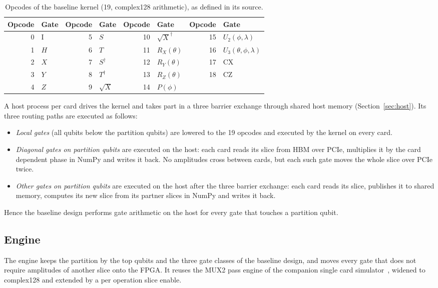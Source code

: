 \begin{table}[t]
\caption{Opcodes of the baseline kernel (19, complex128 arithmetic), as defined in its source.}\label{tab:opcodes}
\begin{tabular}{@{}rlrlrlrl@{}}
\toprule
Opcode & Gate & Opcode & Gate & Opcode & Gate & Opcode & Gate \\
\midrule
0 & I & 5 & $S$ & 10 & $\sqrt{X}^\dagger$ & 15 & $U_2(\phi,\lambda)$ \\
1 & $H$ & 6 & $T$ & 11 & $R_X(\theta)$ & 16 & $U_3(\theta,\phi,\lambda)$ \\
2 & $X$ & 7 & $S^\dagger$ & 12 & $R_Y(\theta)$ & 17 & CX \\
3 & $Y$ & 8 & $T^\dagger$ & 13 & $R_Z(\theta)$ & 18 & CZ \\
4 & $Z$ & 9 & $\sqrt{X}$ & 14 & $P(\phi)$ & & \\
\bottomrule
\end{tabular}
\end{table}
 A host process per card drives the kernel and takes part in a
three barrier exchange through shared host memory (Section~\ref{sec:host}). Its three routing paths are executed as
follows:
\begin{itemize}
\item \emph{Local gates} (all qubits below the partition qubits) are lowered to the 19 opcodes and executed by the
kernel on every card.
\item \emph{Diagonal gates on partition qubits} are executed on the host: each card reads its slice from HBM over
PCIe, multiplies it by the card dependent phase in NumPy and writes it back. No amplitudes cross between cards, but
each such gate moves the whole slice over PCIe twice.
\item \emph{Other gates on partition qubits} are executed on the host after the three barrier exchange: each card
reads its slice, publishes it to shared memory, computes its new slice from its partner slices in NumPy and writes it
back.
\end{itemize}
Hence the baseline design performs gate arithmetic on the host for every gate that touches a partition qubit.

\subsection{Engine}\label{subsec:engine}

The engine keeps the partition by the top qubits and the three gate classes of the baseline design, and
moves every gate that does not require amplitudes of another slice onto the FPGA. It reuses the MUX2 pass engine of the
companion single card simulator~\cite{tiwari2026fpga30}, widened to complex128 and extended by a per operation slice
enable.

